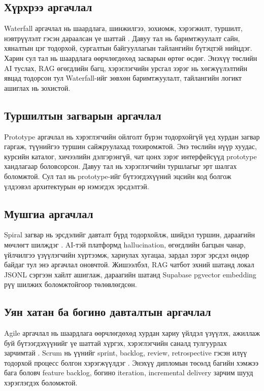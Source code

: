 \subsection{Хүрхрээ аргачлал}
Waterfall аргачлал нь шаардлага, шинжилгээ, зохиомж, хэрэгжилт, туршилт, нэвтрүүлэлт гэсэн дараалсан үе шаттай \cite{royce_waterfall_1970}. Давуу тал нь баримтжуулалт сайн, хяналтын цэг тодорхой, сургалтын байгууллагын тайлангийн бүтэцтэй нийцдэг. Харин сул тал нь шаардлага өөрчлөгдөхөд засварын өртөг өсдөг. Энэхүү төслийн AI туслах, RAG өгөгдлийн багц, хэрэглэгчийн урсгал зэрэг нь хөгжүүлэлтийн явцад тодорсон тул Waterfall-ийг зөвхөн баримтжуулалт, тайлангийн логикт ашиглах нь зохистой.

\subsection{Туршилтын загварын аргачлал}
Prototype аргачлал нь хэрэглэгчийн ойлголт бүрэн тодорхойгүй үед хурдан загвар гаргаж, түүнийгээ туршин сайжруулахад тохиромжтой. Энэ төслийн нүүр хуудас, курсийн каталог, хичээлийн дэлгэрэнгүй, чат цонх зэрэг интерфейсүүд prototype хандлагаар боловсорсон. Давуу тал нь хэрэглэгчийн туршлагыг эрт шалгах боломжтой. Сул тал нь prototype-ийг бүтээгдэхүүний эцсийн код болгож үлдээвэл архитектурын өр нэмэгдэх эрсдэлтэй.

\subsection{Мушгиа аргачлал}
Spiral загвар нь эрсдэлийг давталт бүрд тодорхойлж, шийдэл туршин, дараагийн мөчлөгт шилждэг \cite{boehm_spiral_1988}. AI-тэй платформд hallucination, өгөгдлийн багцын чанар, үйлчилгээ үзүүлэгчийн хүртээмж, хариулах хугацаа, зардал зэрэг эрсдэл өндөр байдаг тул энэ аргачлал оновчтой. Жишээлбэл, RAG чатбот эхний шатанд локал JSONL сэргээн хайлт ашиглаж, дараагийн шатанд Supabase pgvector embedding рүү шилжих боломжтойгоор төлөвлөгдсөн.

\subsection{Уян хатан ба богино давталтын аргачлал}
Agile аргачлал нь шаардлага өөрчлөгдөхөд хурдан хариу үйлдэл үзүүлэх, ажиллаж буй бүтээгдэхүүнийг үе шаттай хүргэх, хэрэглэгчийн саналд тулгуурлах зарчимтай \cite{agile_manifesto_2001}. Scrum нь үүнийг sprint, backlog, review, retrospective гэсэн илүү тодорхой процесс болгон хэрэгжүүлдэг \cite{scrum_guide_2020}. Энэхүү дипломын төсөлд багийн хэмжээ бага боловч feature backlog, богино iteration, incremental delivery зарчим шууд хэрэглэгдэх боломжтой.

